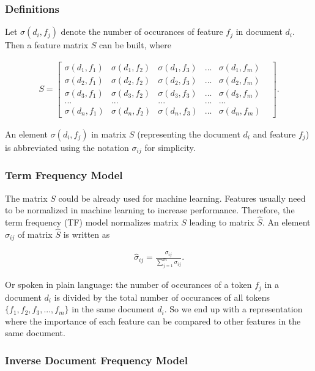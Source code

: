 \documentclass[a4paper,12pt,nottoc]{article}
\begin{document}
\subsubsection{Definitions}

Let $\sigma(d_i, f_j)$ denote the number of occurances of feature $f_j$ in document $d_i$. Then a feature matrix $S$ can be built, where

\begin{gather}
S =
\begin{bmatrix}
\sigma(d_1, f_1) & \sigma(d_1, f_2) & \sigma(d_1, f_3) & ... & \sigma(d_1, f_m) \\
\sigma(d_2, f_1) & \sigma(d_2, f_2) & \sigma(d_2, f_3) & ... & \sigma(d_2, f_m) \\
\sigma(d_3, f_1) & \sigma(d_3, f_2) & \sigma(d_3, f_3) & ... & \sigma(d_3, f_m) \\
... & ... & ... & ... & ... & \\
 \sigma(d_n, f_1) & \sigma(d_n, f_2) & \sigma(d_n, f_3) & ... & \sigma(d_n, f_m)
\end{bmatrix}.
\end{gather}

\noindent An element $\sigma(d_i, f_j)$ in matrix $S$ (representing the document $d_i$ and feature $f_j$) is abbreviated using the notation $\sigma_{ij}$ for simplicity.

\subsubsection{Term Frequency Model}

The matrix $S$ could be already used for machine learning. Features usually need to be normalized in machine learning to increase performance. Therefore, the term frequency (TF) model normalizes matrix $S$ leading to matrix $\hat{S}$. An element $\hat{\sigma}_{ij}$ of matrix $\hat{S}$ is written as

\begin{gather}
\hat{\sigma}_{ij} = \frac{\sigma_{ij}}{\sum_{j=1}^{m}\sigma_{ij}}.
\end{gather}

\noindent Or spoken in plain language: the number of occurances of a token $f_j$ in a document $d_i$ is divided by the total number of occurances of all tokens $\{f_1, f_2, f_3, ..., f_m\}$ in the same document $d_i$. So we end up with a representation where the importance of each feature can be compared to other features in the same document.

\subsubsection{Inverse Document Frequency Model}
\end{document}

